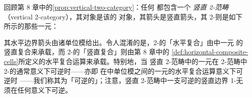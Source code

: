 \begin{recall}\label{rec:vertical-two-category}
回顾第 8 章中的\cref{prop:vertical-two-category}：任何\trVirtualEquipment{}%
都包含一个%
\emph{竖直 2-范畴}（vertical 2-category），其对象是该\trVirtualEquipment{}的
对象，其箭头是竖直箭头，其 2-\trCell{}则是如下所示的那些一元\trCell：
\begin{rveq}\label{eq:vertical-2-category-unary-cell}
\end{rveq}
其水平边界箭头由诸单位模给出。令人混淆的是，2-\trCell{}的「水平复合」由\trVirtualEquipment{}中一元\trCell{}%
的竖直复合来承载，而 2-\trCell{}的「竖直复合」则由第 8 章中的%
\cref{def:horizontal-composite-cells}所定义的水平复合运算来承载。特别地，当
竖直 2-范畴中的一元\trCell{}在 2-范畴中 2-\trCell{}的通常意义下可逆时——亦即
在\trVirtualEquipment{}中单位模之间的一元\trCell{}的水平复合运算意义下可逆时
——我们称其为「可逆的」；注意，竖直 2-范畴中一支可逆\trCell{}的竖直边界
1-\trCell{}无须在任何意义下可逆。


\end{recall}
